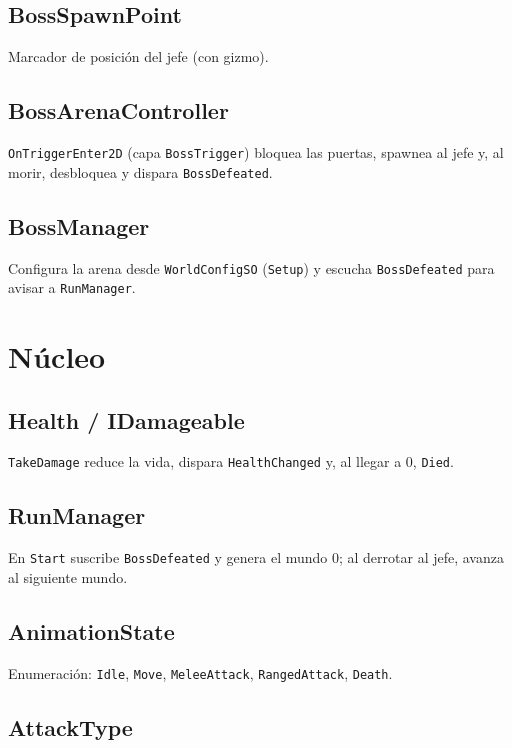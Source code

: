 \documentclass[a4paper,12pt]{article}
\begin{document}
\subsection{BossSpawnPoint}

Marcador de posición del jefe (con gizmo).

\subsection{BossArenaController}

\texttt{OnTriggerEnter2D} (capa \texttt{BossTrigger}) bloquea las puertas, spawnea al jefe y, al morir, desbloquea y dispara \texttt{BossDefeated}.

\subsection{BossManager}

Configura la arena desde \texttt{WorldConfigSO} (\texttt{Setup}) y escucha \texttt{BossDefeated} para avisar a \texttt{RunManager}.

\section{Núcleo}

\subsection{Health / IDamageable}

\texttt{TakeDamage} reduce la vida, dispara \texttt{HealthChanged} y, al llegar a 0, \texttt{Died}.

\subsection{RunManager}

En \texttt{Start} suscribe \texttt{BossDefeated} y genera el mundo 0; al derrotar al jefe, avanza al siguiente mundo.

\subsection{AnimationState}

Enumeración: \texttt{Idle}, \texttt{Move}, \texttt{MeleeAttack}, \texttt{RangedAttack}, \texttt{Death}.

\subsection{AttackType}
\end{document}
